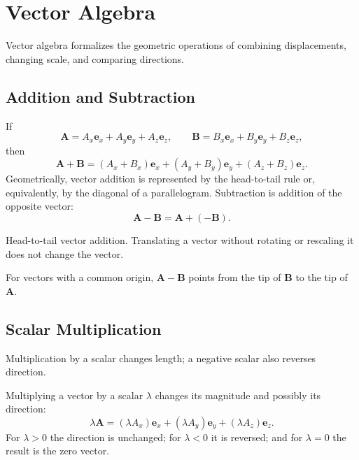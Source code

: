 \section{Vector Algebra}
\label{sec:vector-algebra}

Vector algebra formalizes the geometric operations of combining displacements, changing scale, and comparing directions.

\subsection{Addition and Subtraction}

If
\[
\mathbf A=A_x\mathbf e_x+A_y\mathbf e_y+A_z\mathbf e_z,
\qquad
\mathbf B=B_x\mathbf e_x+B_y\mathbf e_y+B_z\mathbf e_z,
\]
then
\[
\mathbf A+\mathbf B=(A_x+B_x)\mathbf e_x+(A_y+B_y)\mathbf e_y+(A_z+B_z)\mathbf e_z.
\]
Geometrically, vector addition is represented by the head-to-tail rule or, equivalently, by the diagonal of a parallelogram. Subtraction is addition of the opposite vector:
\[
\mathbf A-\mathbf B=\mathbf A+(-\mathbf B).
\]

\begin{bookfigure}{Head-to-tail vector addition. Translating a vector without rotating or rescaling it does not change the vector.}

\end{bookfigure}

\begin{bookfigure}{For vectors with a common origin, $\mathbf A-\mathbf B$ points from the tip of $\mathbf B$ to the tip of $\mathbf A$.}

\label{fig:vector-subtraction}
\end{bookfigure}

\subsection{Scalar Multiplication}

\begin{bookfigure}{Multiplication by a scalar changes length; a negative scalar also reverses direction.}

\label{fig:scalar-multiplication}
\end{bookfigure}

Multiplying a vector by a scalar $\lambda$ changes its magnitude and possibly its direction:
\[
\lambda\mathbf A=(\lambda A_x)\mathbf e_x+(\lambda A_y)\mathbf e_y+(\lambda A_z)\mathbf e_z.
\]
For $\lambda>0$ the direction is unchanged; for $\lambda<0$ it is reversed; and for $\lambda=0$ the result is the zero vector.

